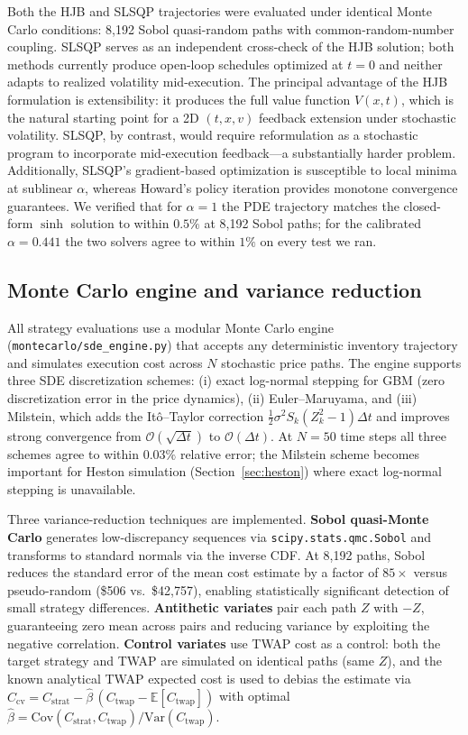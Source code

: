 \documentclass[11pt,letterpaper]{article}
\begin{document}
Both the HJB and SLSQP trajectories were evaluated under identical Monte Carlo
conditions: 8{,}192 Sobol quasi-random paths with common-random-number coupling.
SLSQP serves as an independent cross-check of the HJB solution; both methods
currently produce open-loop schedules optimized at $t=0$ and neither adapts to
realized volatility mid-execution.  The principal advantage of the HJB
formulation is extensibility: it produces the full value function $V(x,t)$,
which is the natural starting point for a 2D $(t,x,v)$ feedback extension under
stochastic volatility.  SLSQP, by contrast, would require reformulation as a
stochastic program to incorporate mid-execution feedback---a substantially harder
problem.  Additionally, SLSQP's gradient-based optimization is susceptible to
local minima at sublinear $\alpha$, whereas Howard's policy iteration provides
monotone convergence guarantees.  We verified that for $\alpha=1$ the PDE
trajectory matches the closed-form $\sinh$ solution to within $0.5\%$ at 8{,}192
Sobol paths; for the calibrated $\alpha=0.441$ the two solvers agree to within
$1\%$ on every test we ran.

\subsection{Monte Carlo engine and variance reduction}
\label{sec:mc-engine}
 
All strategy evaluations use a modular Monte Carlo engine
(\texttt{montecarlo/sde\_engine.py}) that accepts any deterministic inventory
trajectory and simulates execution cost across $N$ stochastic price paths.
The engine supports three SDE discretization schemes: (i) exact log-normal
stepping for GBM (zero discretization error in the price dynamics), (ii)
Euler--Maruyama, and (iii) Milstein, which adds the It\^{o}--Taylor correction
$\tfrac{1}{2}\sigma^{2}S_{k}(Z_{k}^{2}-1)\Delta t$ and improves strong
convergence from $\mathcal{O}(\sqrt{\Delta t})$ to $\mathcal{O}(\Delta t)$.
At $N=50$ time steps all three schemes agree to within $0.03\%$ relative error;
the Milstein scheme becomes important for Heston simulation
(Section~\ref{sec:heston}) where exact log-normal stepping is unavailable.
 
Three variance-reduction techniques are implemented.
\textbf{Sobol quasi-Monte Carlo} generates low-discrepancy sequences via
\texttt{scipy.stats.qmc.Sobol} and transforms to standard normals via
the inverse CDF.  At 8{,}192 paths, Sobol reduces the standard error of the
mean cost estimate by a factor of $85\times$ versus pseudo-random
(\$506 vs.\ \$42{,}757), enabling statistically significant detection of small
strategy differences.
\textbf{Antithetic variates} pair each path $Z$ with $-Z$, guaranteeing
zero mean across pairs and reducing variance by exploiting the negative
correlation.
\textbf{Control variates} use TWAP cost as a control: both the target
strategy and TWAP are simulated on identical paths (same $Z$), and the
known analytical TWAP expected cost is used to debias the estimate via
$C_{\mathrm{cv}} = C_{\mathrm{strat}} - \hat\beta\,(C_{\mathrm{twap}} -
\mathbb{E}[C_{\mathrm{twap}}])$ with optimal $\hat\beta =
\mathrm{Cov}(C_{\mathrm{strat}}, C_{\mathrm{twap}}) /
\mathrm{Var}(C_{\mathrm{twap}})$.
 
\end{document}
